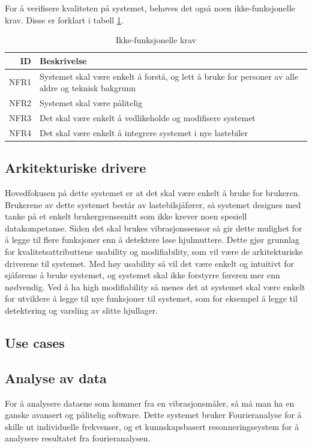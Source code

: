 For å verifisere kvaliteten på systemet, behøves det også noen ikke-funksjonelle krav. Disse er forklart i tabell \ref{tab:nfrequirements}.
\begin{table}[H]
\caption{Ikke-funksjonelle krav}
\label{tab:nfrequirements}
\begin{tabularx}{\textwidth}{r|X}
ID & Beskrivelse \\ 
\hline
NFR1 & Systemet skal være enkelt å forstå, og lett å bruke for personer av alle aldre og teknisk bakgrunn \\
NFR2 & Systemet skal være pålitelig \\
NFR3 & Det skal være enkelt å vedlikeholde og modifisere systemet \\
NFR4 & Det skal være enkelt å integrere systemet i nye lastebiler\\
\hline
\end{tabularx}
\end{table}

\subsection{Arkitekturiske drivere}
Hovedfokusen på dette systemet er at det skal være enkelt å bruke for brukeren. 
Brukerene av dette systemet består av lastebilsjåfører, så systemet designes med tanke på et enkelt brukergrensesnitt som ikke krever noen spesiell datakompetanse. 
Siden det skal brukes vibrasjonssensor så gir dette mulighet for å legge til flere funksjoner enn å detektere løse hjulmuttere. 
Dette gjør grunnlag for kvalitetsattributtene usability og modifiability, som vil være de arkitekturiske driverene til systemet. 
Med høy usability så vil det være enkelt og intuitivt for sjåførene å bruke systemet, og systemet skal ikke forstyrre føreren mer enn nødvendig. 
Ved å ha high modifiability så menes det at systemet skal være enkelt for utviklere å legge til nye funksjoner til systemet, som for eksempel å legge til detektering og varsling av slitte hjullager.


\subsection{Use cases}


\subsection{Analyse av data}
For å analysere dataene som kommer fra en vibrasjonsmåler, så må man ha en ganske avansert og pålitelig software. Dette systemet bruker Fourieranalyse for å skille ut individuelle frekvenser, og et kunnskapsbasert resonneringssystem for å analysere resultatet fra fourieranalysen.



